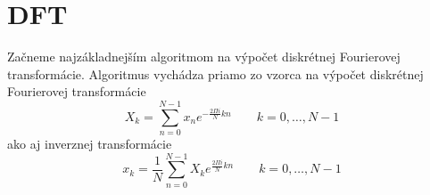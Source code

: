 \section{DFT}

Začneme najzákladnejším algoritmom na výpočet diskrétnej Fourierovej
transformácie. Algoritmus vychádza priamo zo vzorca na výpočet
diskrétnej Fourierovej transformácie
\begin{equation*}
X_k = \sum_{n=0}^{N-1} x_n e^{-\frac{2\Pi i}{N} k n} 
    \quad \quad k=0, \dots, N-1
\end{equation*}
ako aj inverznej transformácie
\begin{equation*}
x_k = \frac{1}{N} \sum_{n=0}^{N-1} X_k e^{ \frac{2 \Pi i}{N} k n}
    \quad \quad k=0, \dots,N-1
\end{equation*}


